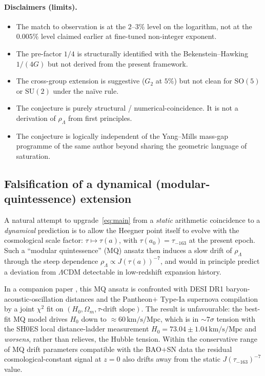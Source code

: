 \documentclass[11pt,a4paper]{article}
\newcommand{\SU}{\mathrm{SU}}
\newcommand{\SO}{\mathrm{SO}}
\newcommand{\rhoL}{\rho_{\Lambda}}
\theoremstyle{plain}
\begin{document}
\paragraph{Disclaimers (limits).}
\begin{itemize}[leftmargin=2em]
  \item The match to observation is at the $2$--$3\%$ level on the logarithm, not at the $0.005\%$ level claimed earlier at fine-tuned non-integer exponent.
  \item The pre-factor $1/4$ is structurally identified with the Bekenstein--Hawking $1/(4G)$ but not derived from the present framework.
  \item The cross-group extension is suggestive ($G_{2}$ at $5\%$) but not clean for $\SO(5)$ or $\SU(2)$ under the naïve rule.
  \item The conjecture is purely structural / numerical-coincidence. It is not a derivation of $\rhoL$ from first principles.
  \item The conjecture is logically independent of the Yang--Mills mass-gap programme of the same author beyond sharing the geometric language of saturation.
\end{itemize}

\subsection{Falsification of a dynamical (modular-quintessence) extension}\label{sec:5bis}

A natural attempt to upgrade~\eqref{eq:main} from a \emph{static} arithmetic coincidence to a \emph{dynamical} prediction is to allow the Heegner point itself to evolve with the cosmological scale factor: $\tau\mapsto\tau(a)$, with $\tau(a_{0})=\tau_{-163}$ at the present epoch. Such a ``modular quintessence'' (MQ) ansatz then induces a slow drift of $\rhoL$ through the steep dependence $\rhoL\propto J(\tau(a))^{-7}$, and would in principle predict a deviation from $\Lambda$CDM detectable in low-redshift expansion history.

In a companion paper \cite{Remondiere2026MQ}, this MQ ansatz is confronted with DESI DR1 baryon-acoustic-oscillation distances \cite{DESI2024} and the Pantheon$+$ Type-Ia supernova compilation by a joint $\chi^{2}$ fit on $(H_{0},\Omega_{m},\tau\text{-drift slope})$. The result is unfavourable: the best-fit MQ model drives $H_{0}$ down to $\approx 60\,\mathrm{km/s/Mpc}$, which is in $\sim 7\sigma$ tension with the SH0ES local distance-ladder measurement $H_{0}=73.04\pm 1.04\,\mathrm{km/s/Mpc}$ \cite{Riess2022} and \emph{worsens}, rather than relieves, the Hubble tension. Within the conservative range of MQ drift parameters compatible with the BAO$+$SN data the residual cosmological-constant signal at $z=0$ also drifts away from the static $J(\tau_{-163})^{-7}$ value.
\end{document}
